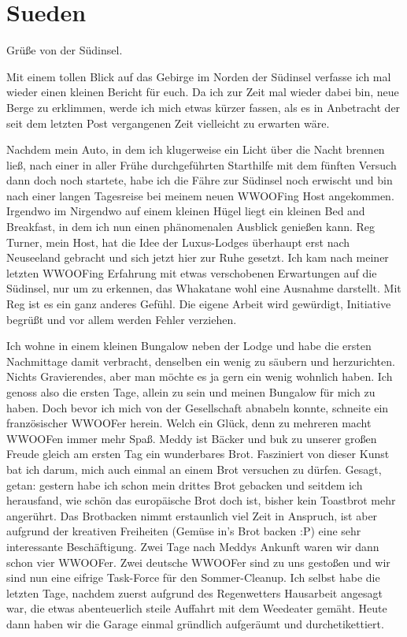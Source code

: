 \chapter{Sueden}

Grüße von der Südinsel.

Mit einem tollen Blick auf das Gebirge im Norden der Südinsel verfasse
ich mal wieder einen kleinen Bericht für euch. Da ich zur Zeit mal
wieder dabei bin, neue Berge zu erklimmen, werde ich mich etwas kürzer
fassen, als es in Anbetracht der seit dem letzten Post vergangenen Zeit
vielleicht zu erwarten wäre.

Nachdem mein Auto, in dem ich klugerweise ein Licht über die Nacht
brennen ließ, nach einer in aller Frühe durchgeführten Starthilfe mit
dem fünften Versuch dann doch noch startete, habe ich die Fähre zur
Südinsel noch erwischt und bin nach einer langen Tagesreise bei meinem
neuen WWOOFing Host angekommen. Irgendwo im Nirgendwo auf einem kleinen
Hügel liegt ein kleinen Bed and Breakfast, in dem ich nun einen
phänomenalen Ausblick genießen kann. Reg Turner, mein Host, hat die Idee
der Luxus-Lodges überhaupt erst nach Neuseeland gebracht und sich jetzt
hier zur Ruhe gesetzt. Ich kam nach meiner letzten WWOOFing Erfahrung
mit etwas verschobenen Erwartungen auf die Südinsel, nur um zu erkennen,
das Whakatane wohl eine Ausnahme darstellt. Mit Reg ist es ein ganz
anderes Gefühl. Die eigene Arbeit wird gewürdigt, Initiative begrüßt und
vor allem werden Fehler verziehen.

Ich wohne in einem kleinen Bungalow neben der Lodge und habe die ersten
Nachmittage damit verbracht, denselben ein wenig zu säubern und
herzurichten. Nichts Gravierendes, aber man möchte es ja gern ein wenig
wohnlich haben. Ich genoss also die ersten Tage, allein zu sein und
meinen Bungalow für mich zu haben. Doch bevor ich mich von der
Gesellschaft abnabeln konnte, schneite ein französischer WWOOFer herein.
Welch ein Glück, denn zu mehreren macht WWOOFen immer mehr Spaß. Meddy
ist Bäcker und buk zu unserer großen Freude gleich am ersten Tag ein
wunderbares Brot. Fasziniert von dieser Kunst bat ich darum, mich auch
einmal an einem Brot versuchen zu dürfen. Gesagt, getan: gestern habe
ich schon mein drittes Brot gebacken und seitdem ich herausfand, wie
schön das europäische Brot doch ist, bisher kein Toastbrot mehr
angerührt. Das Brotbacken nimmt erstaunlich viel Zeit in Anspruch, ist
aber aufgrund der kreativen Freiheiten (Gemüse in's Brot backen :P) eine
sehr interessante Beschäftigung. Zwei Tage nach Meddys Ankunft waren wir
dann schon vier WWOOFer. Zwei deutsche WWOOFer sind zu uns gestoßen und
wir sind nun eine eifrige Task-Force für den Sommer-Cleanup. Ich selbst
habe die letzten Tage, nachdem zuerst aufgrund des Regenwetters
Hausarbeit angesagt war, die etwas abenteuerlich steile Auffahrt mit dem
Weedeater gemäht. Heute dann haben wir die Garage einmal gründlich
aufgeräumt und durchetikettiert.

